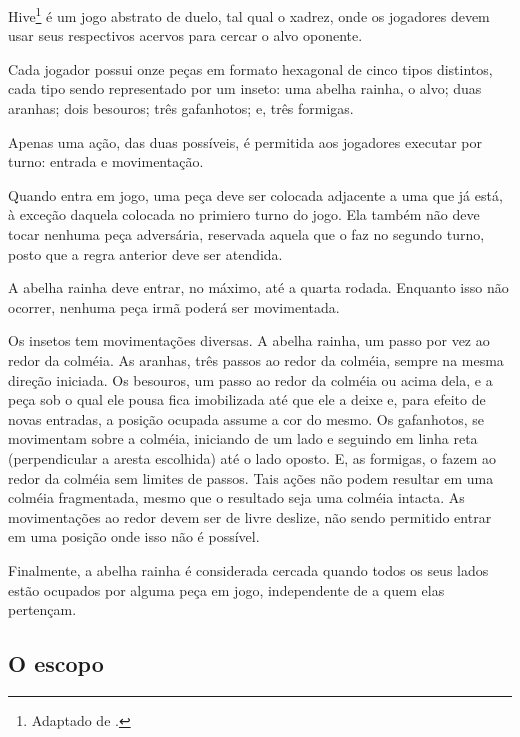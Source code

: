     Hive\footnote{Adaptado de \cite{UltraBoardGames2020}.} é um jogo
    abstrato de duelo, tal qual o xadrez, onde os jogadores devem usar seus
    respectivos acervos para cercar o alvo oponente.

    Cada jogador possui onze peças em formato hexagonal de cinco tipos
    distintos, cada tipo sendo representado por um inseto: uma abelha rainha, o
    alvo; duas aranhas; dois besouros; três gafanhotos; e, três formigas.

    Apenas uma ação, das duas possíveis, é permitida aos jogadores executar por
    turno: entrada e movimentação.

    Quando entra em jogo, uma peça deve ser colocada adjacente a uma que já
    está, à exceção daquela colocada no primiero turno do jogo. Ela também não
    deve tocar nenhuma peça adversária, reservada aquela que o faz no segundo
    turno, posto que a regra anterior deve ser atendida.

    A abelha rainha deve entrar, no máximo, até a quarta rodada. Enquanto isso
    não ocorrer, nenhuma peça irmã poderá ser movimentada.

    Os insetos tem movimentações diversas. A abelha rainha, um passo por vez ao
    redor da colméia. As aranhas, três passos ao redor da colméia, sempre na
    mesma direção iniciada. Os besouros, um passo ao redor da colméia ou acima
    dela, e a peça sob o qual ele pousa fica imobilizada até que ele a deixe e,
    para efeito de novas entradas, a posição ocupada assume a cor do mesmo. Os
    gafanhotos, se movimentam sobre a colméia, iniciando de um lado e seguindo
    em linha reta (perpendicular a aresta escolhida) até o lado oposto.
    E,  as formigas, o fazem ao redor da colméia sem limites de passos. Tais
    ações não podem resultar em uma colméia fragmentada, mesmo que o resultado
    seja uma colméia intacta. As movimentações ao redor devem ser de livre
    deslize, não sendo permitido entrar em uma posição onde isso não é possível.

    Finalmente, a abelha rainha é considerada cercada quando todos os seus lados
    estão ocupados por alguma peça em jogo, independente de a quem elas
    pertençam.


    \subsection{O escopo}


